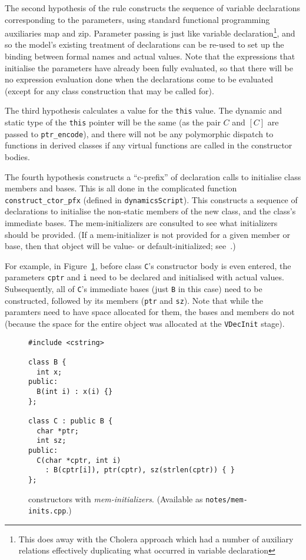 \documentclass[11pt]{article}
\begin{document}
The second hypothesis of the rule constructs the sequence of variable
declarations corresponding to the parameters, using standard
functional programming auxiliaries \textsf{map} and \textsf{zip}.
Parameter passing is just like variable declaration\footnote{This does
  away with the \textsf{Cholera} approach which had a number of
  auxiliary relations effectively duplicating what occurred in
  variable declaration}, and so the model's existing treatment of
declarations can be re-used to set up the binding between formal names
and actual values.  Note that the expressions that initialise the
parameters have already been fully evaluated, so that there will be no
expression evaluation done when the declarations come to be evaluated
(except for any class construction that may be called for).

The third hypothesis calculates a value for the \texttt{this} value.
The dynamic and static type of the \texttt{this} pointer will be the
same (as the pair $C$ and $[C]$ are passed to \texttt{ptr_encode}),
and there will not be any polymorphic dispatch to functions in derived
classes if any virtual functions are called in the constructor bodies.

The fourth hypothesis constructs a ``c-prefix'' of declaration calls
to initialise class members and bases.  This is all done in the
complicated function \texttt{construct_ctor_pfx} (defined in
\texttt{dynamicsScript}).  This constructs a sequence of declarations
to initialise the non-static members of the new class, and the class's
immediate bases.  The mem-initializers are consulted to see what
initializers should be provided.  (If a mem-initializer is not
provided for a given member or base, then that object will be value-
or default-initialized; see~\cite[\S12.6.2, paragraphs
3--4]{cpp-standard-iso14882}.)

For example, in Figure~\ref{fig:mem-inits}, before class \texttt{C}'s
constructor body is even entered, the parameters \texttt{cptr} and
\texttt{i} need to be declared and initialised with actual values.
Subsequently, all of \texttt{C}'s immediate bases (just \texttt{B} in
this case) need to be constructed, followed by its members
(\texttt{ptr} and \texttt{sz}).  Note that while the paramters need to
have space allocated for them, the bases and members do not (because
the space for the entire object was allocated at the \texttt{VDecInit}
stage).

\begin{figure}[htbp]
\begin{verbatim}
#include <cstring>

class B {
  int x;
public:
  B(int i) : x(i) {}
};

class C : public B {
  char *ptr;
  int sz;
public:
  C(char *cptr, int i)
    : B(cptr[i]), ptr(cptr), sz(strlen(cptr)) { }
};
\end{verbatim}
\caption{\cpp{} constructors with \emph{mem-initializers}.  (Available
as \texttt{notes/mem-inits.cpp}.)}
\label{fig:mem-inits}
\end{figure}
\end{document}
